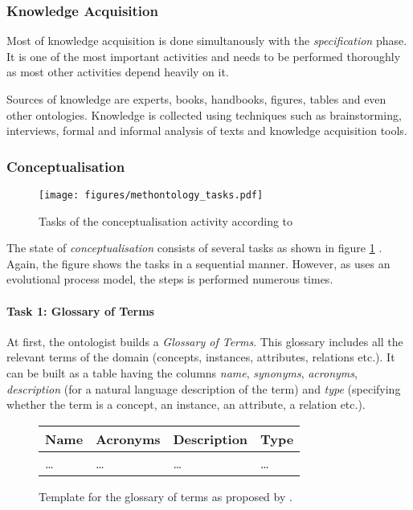 \subsubsection{Knowledge Acquisition}

Most of knowledge acquisition is done simultanously with the \emph{specification} phase. It is one of the most important activities and needs to be performed thoroughly as most other activities depend heavily on it.

Sources of knowledge are experts, books, handbooks, figures, tables and even other ontologies. Knowledge is collected using techniques such as brainstorming, interviews, formal and informal analysis of texts and knowledge acquisition tools.

\subsubsection{Conceptualisation}
\label{subsec:methontology_conceptualisation}
\begin{figure}
  \texttt{[image: figures/methontology\_tasks.pdf]}
  \caption{Tasks of the conceptualisation activity according to \methontology \cite{MethontologyLegal}}
  \label{fig:methontology2}
\end{figure}

The state of \emph{conceptualisation} consists of several tasks as shown in figure \ref{fig:methontology2} \cite{MethontologyLegal}. Again, the figure shows the tasks in a sequential manner. However, as \methontology uses an evolutional process model, the steps is performed numerous times.

\paragraph{Task 1: Glossary of Terms}

At first, the ontologist builds a \emph{Glossary of Terms}. This glossary includes all the relevant terms of the domain (concepts, instances, attributes, relations etc.). It can be built as a table having the columns \emph{name}, \emph{synonyms}, \emph{acronyms}, \emph{description} (for a natural language description of the term) and \emph{type} (specifying whether the term is a concept, an instance, an attribute, a relation etc.).

\begin{figure}
\centering
\begin{tabular}{|p{}|p{}|p{}|p{}|}
  \hline
  \textbf{Name} & \textbf{Acronyms} & \textbf{Description} & \textbf{Type} \\
  \hline\hline
  … & … & … & … \\
  \hline
\end{tabular}
\caption{Template for the glossary of terms as proposed by \methontology.}
\label{fig:methontology_example_glossary}
\end{figure}


